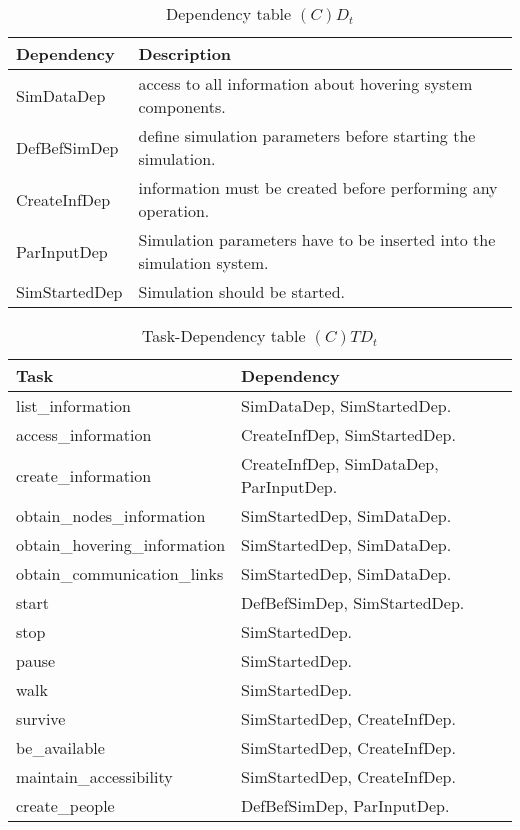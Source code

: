 \begin{table}[H]
	\centering
	\begin{tabular}{|p{4cm}|p{8cm}|}
			\hline
			\textbf{Dependency} & \textbf{Description} \\
			\hline
			SimDataDep & access to all information about hovering system
			components. \\
			\hline
			DefBefSimDep & define simulation parameters before starting the
			simulation. \\
			\hline
			CreateInfDep & information must be created before performing any
			operation. \\
			\hline
			ParInputDep & Simulation parameters have to be inserted into the
			simulation system. \\
			\hline
			SimStartedDep & Simulation should be started. \\
			\hline
		\end{tabular}
	\caption{Dependency table $(C)D_t$}
	\label{tab:cdt}
\end{table}

\begin{table}[H]
	\centering
	\begin{tabular}{|p{5cm}|p{7cm}|}
			\hline
			\textbf{Task} & \textbf{Dependency} \\
			\hline
			list\_information & SimDataDep, SimStartedDep.\\
			\hline
			access\_information & CreateInfDep, SimStartedDep.\\
			\hline
			create\_information & CreateInfDep, SimDataDep, ParInputDep. \\
			\hline
			obtain\_nodes\_information & SimStartedDep, SimDataDep.\\
			\hline
			obtain\_hovering\_information & SimStartedDep, SimDataDep. \\
			\hline
			obtain\_communication\_links & SimStartedDep, SimDataDep. \\
			\hline
			start & DefBefSimDep, SimStartedDep. \\
			\hline
			stop & SimStartedDep. \\
			\hline
			pause &SimStartedDep. \\
			\hline
			walk & SimStartedDep. \\
			\hline
			survive & SimStartedDep, CreateInfDep. \\
			\hline
			be\_available & SimStartedDep, CreateInfDep. \\
			\hline
			maintain\_accessibility & SimStartedDep, CreateInfDep. \\
			\hline
			create\_people & DefBefSimDep, ParInputDep. \\
			\hline
		\end{tabular}
	\caption{Task-Dependency table $(C)TD_t$}
	\label{tab:ctdt}
\end{table}

